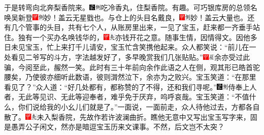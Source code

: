 于是转弯向北奔梨香院来。{\includegraphics[width=3mm]{../Images/00006}\includegraphics[width=3mm]{../Images/00011}\footnotesize \kaishu 吃冷香丸，住梨香院。有趣。}可巧银库房的总领名唤吴新登{\includegraphics[width=3mm]{../Images/00002}\includegraphics[width=3mm]{../Images/00011}\footnotesize \kaishu 妙！盖云无星戥也。}与仓上的头目名戴良，{\includegraphics[width=3mm]{../Images/00002}\includegraphics[width=3mm]{../Images/00011}\footnotesize \kaishu 妙！盖云大量也。}还有几个管事的头目，共有七个人，从账房里出来，一见了宝玉，赶来都一齐垂手站住。独有一个买办名唤钱华的，{\includegraphics[width=3mm]{../Images/00002}\includegraphics[width=3mm]{../Images/00012}\footnotesize \kaishu 亦钱开花之意。随事生情，因情得文。}因他多日未见宝玉，忙上来打千儿请安，宝玉忙含笑携他起来。众人都笑说：“前儿在一处看见二爷写的斗方，字法越发好了，多早晚赏我们几张贴贴。”{\includegraphics[width=3mm]{../Images/00002}\includegraphics[width=3mm]{../Images/00010}\footnotesize \kaishu 余亦受过此骗，今阅至此，赧然一笑。此时有三十年前向余作此语之人在侧，观其形已皓首驼腰矣，乃使彼亦细听此数语，彼则潸然泣下，余亦为之败兴。}宝玉笑道：“在那里看见了？”众人道：“好几处都有，都称赞的了不得，还和我们寻呢。”{\includegraphics[width=3mm]{../Images/00006}\includegraphics[width=3mm]{../Images/00011}\footnotesize \kaishu 侍奉上人者，无此等见识、无此等迎奉者，难乎免于厌弃，呜呼哀哉。}宝玉笑道：“不值什么，你们说给我的小幺儿们就是了。”一面说，一面前走，众人待他过去，方都各自散了。{\includegraphics[width=3mm]{../Images/00002}\includegraphics[width=3mm]{../Images/00012}\footnotesize \kaishu 未入梨香院，先故作若许波澜曲折。瞧他无意中又写出宝玉写字来，固是愚弄公子闲文，然亦是暗逗宝玉历来文课事。不然，后文岂不太突？}

